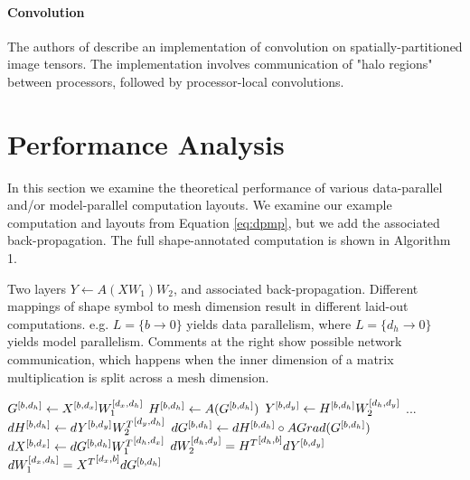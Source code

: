 \documentclass{article}
\begin{document}
\begin{itemize}
\paragraph{Convolution}
The authors of \cite{Jin18} describe an implementation of convolution on spatially-partitioned image tensors.  The implementation involves communication of  "halo regions" between processors, followed by processor-local convolutions.

\section{Performance Analysis} \label{sec:performance}

In this section we examine the theoretical performance of various data-parallel and/or model-parallel computation layouts.  We examine our example computation and layouts from Equation \ref{eq:dpmp}, but we add the associated back-propagation.  The full shape-annotated computation is shown in Algorithm 1.  

\begin{algorithm}[h!]
\caption{Two layers $Y \gets A(XW_1)W_2$, and associated back-propagation.  Different mappings of shape symbol to mesh dimension result in different laid-out computations. e.g. $L=\{b \rightarrow 0 \}$ yields data parallelism, where $L=\{d_h \rightarrow 0 \}$ yields model parallelism.
Comments at the right show possible network communication, which happens when the inner dimension of a matrix multiplication is split across a mesh dimension.}
\begin{algorithmic}[1]

\def \X {X^{\Xshape}}
\def \XT {{X^T}^{\XTshape}}
\def \G {G^{\Hshape}}
\def \H {H^{\Hshape}}
\def \HT {{H^T}^{\HTshape}}
\def \Y {Y^{\Yshape}}
\def \Wone {W_1^{\Woneshape}}
\def \Wtwo {W_2^{\Wtwoshape}}
\def \WoneT {{W_1^T}^{\WoneTshape}}
\def \WtwoT {{W_2^T}^{\WtwoTshape}}

\State $\G \gets \X \Wone$ 
\State $\H \gets A(\G)$
\State $\Y \gets \H \Wtwo$ 
\State ...
\State $d\H \gets d\Y \WtwoT$ 
\State $d\G \gets d\H \circ AGrad(\G)$ 
\State $d\X \gets d\G \WoneT$ 
\State $d\Wtwo = \HT d\Y$ 
\State $d\Wone = \XT d\G$ 
\end{algorithmic}
\end{algorithm}

\def \DXY {d_{xy}}
\def \COMP {6\gamma b \DXY d_h}


\end{itemize}
\end{document}

